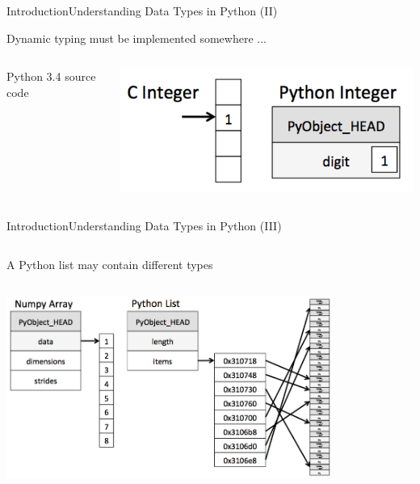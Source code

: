 \documentclass[10pt,compress]{beamer} %
\begin{document}
\begin{frame}{Introduction}{Understanding Data Types in Python (II)}

	Dynamic typing must be implemented somewhere ...

    \begin{columns}
			\begin{block}{\footnotesize{Python 3.4 source code}}
			\vspace{-0.2cm} 
				
			\vspace{-0.2cm} 
			\end{block}

			\includegraphics[width=\textwidth]{figs/cint_vs_pyint.png}	
	\end{columns}

\end{frame}

\begin{frame}[fragile]{Introduction}{Understanding Data Types in Python (III)}
	\begin{columns}
			A Python list may contain different types

	   \begin{exampleblock}{}
			\vspace{-0.2cm} 
			
			\vspace{-0.2cm} 
		\end{exampleblock}
	\end{columns}

	\bigskip

	\centering \includegraphics[width=0.8\textwidth]{figs/array_vs_list.png}	
\end{frame}
\end{document}
